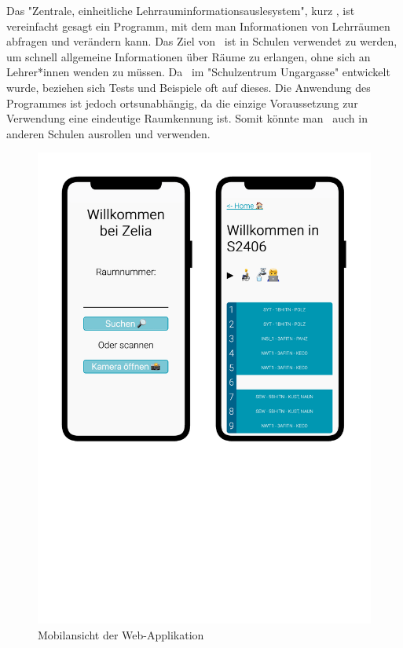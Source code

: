 

Das "Zentrale, einheitliche Lehrrauminformationsauslesystem", kurz \ZELIA, ist vereinfacht gesagt ein Programm, mit dem man Informationen von Lehrräumen abfragen und verändern kann. Das Ziel von \ZELIA\ ist in Schulen verwendet zu werden, um schnell allgemeine Informationen über Räume zu erlangen, ohne sich an Lehrer*innen wenden zu müssen. Da \ZELIA\ im "Schulzentrum Ungargasse" entwickelt wurde, beziehen sich Tests und Beispiele oft auf dieses. Die Anwendung des Programmes ist jedoch ortsunabhängig, da die einzige Voraussetzung zur Verwendung eine eindeutige Raumkennung ist. Somit könnte man \ZELIA\ auch in anderen Schulen ausrollen und verwenden. 

\begin{figure}[H]
    \centering
    \includegraphics[width=120mm]{media/Intro/frontend_mobile.svg.pdf}
    \caption{Mobilansicht der Web-Applikation}
\end{figure}

